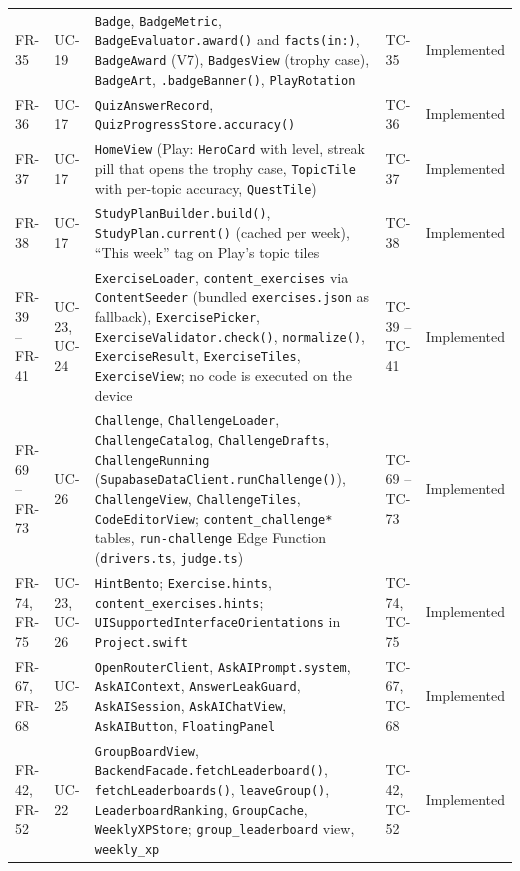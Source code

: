 \documentclass[12pt,letterpaper]{article}
\begin{document}
\begin{xltabular}{\textwidth}{@{}l L{1.6cm} Y L{2.0cm} L{1.9cm}@{}}
FR-35 & UC-19 & \texttt{Badge}, \texttt{BadgeMetric}, \texttt{BadgeEvaluator.award()} and \texttt{facts(in:)}, \texttt{BadgeAward} (V7), \texttt{BadgesView} (trophy case), \texttt{BadgeArt}, \texttt{.badgeBanner()}, \texttt{PlayRotation} & TC-35 & Implemented \\
FR-36 & UC-17 & \texttt{QuizAnswerRecord}, \texttt{QuizProgressStore.accuracy()} & TC-36 & Implemented \\
FR-37 & UC-17 & \texttt{HomeView} (Play: \texttt{HeroCard} with level, streak pill that opens the trophy case, \texttt{TopicTile} with per-topic accuracy, \texttt{QuestTile}) & TC-37 & Implemented \\
FR-38 & UC-17 & \texttt{StudyPlanBuilder.build()}, \texttt{StudyPlan.current()} (cached per week), ``This week'' tag on Play's topic tiles & TC-38 & Implemented \\
FR-39 -- FR-41 & UC-23, UC-24 & \texttt{ExerciseLoader}, \texttt{content\_exercises} via \texttt{ContentSeeder} (bundled \texttt{exercises.json} as fallback), \texttt{ExercisePicker}, \texttt{ExerciseValidator.check()}, \texttt{normalize()}, \texttt{ExerciseResult}, \texttt{ExerciseTiles}, \texttt{ExerciseView}; no code is executed on the device & TC-39 -- TC-41 & Implemented \\
FR-69 -- FR-73 & UC-26 & \texttt{Challenge}, \texttt{ChallengeLoader}, \texttt{ChallengeCatalog}, \texttt{ChallengeDrafts}, \texttt{ChallengeRunning} (\texttt{SupabaseDataClient.runChallenge()}), \texttt{ChallengeView}, \texttt{ChallengeTiles}, \texttt{CodeEditorView}; \texttt{content\_challenge*} tables, \texttt{run-challenge} Edge Function (\texttt{drivers.ts}, \texttt{judge.ts}) & TC-69 -- TC-73 & Implemented \\
FR-74, FR-75 & UC-23, UC-26 & \texttt{HintBento}; \texttt{Exercise.hints}, \texttt{content\_exercises.hints}; \texttt{UISupportedInterfaceOrientations} in \texttt{Project.swift} & TC-74, TC-75 & Implemented \\
FR-67, FR-68 & UC-25 & \texttt{OpenRouterClient}, \texttt{AskAIPrompt.system}, \texttt{AskAIContext}, \texttt{AnswerLeakGuard}, \texttt{AskAISession}, \texttt{AskAIChatView}, \texttt{AskAIButton}, \texttt{FloatingPanel} & TC-67, TC-68 & Implemented \\
FR-42, FR-52 & UC-22 & \texttt{GroupBoardView}, \texttt{BackendFacade.fetchLeaderboard()}, \texttt{fetchLeaderboards()}, \texttt{leaveGroup()}, \texttt{LeaderboardRanking}, \texttt{GroupCache}, \texttt{WeeklyXPStore}; \texttt{group\_leaderboard} view, \texttt{weekly\_xp} & TC-42, TC-52 & Implemented \\

\end{xltabular}
\end{document}
